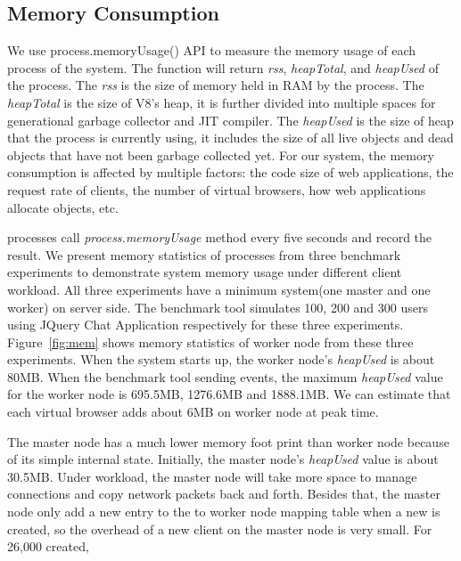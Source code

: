 \jquerychatlatency{}


\subsection{Memory Consumption}
We use \nodejs{} process.memoryUsage() API to measure the memory usage of each process
of the system.
The function will return \emph{rss}, \emph{heapTotal}, and \emph{heapUsed} of the process.
The \emph{rss} is the size of memory held in RAM by the process.
The \emph{heapTotal} is the size of V8's heap, it is further divided into
multiple spaces for generational garbage collector and JIT compiler.
The \emph{heapUsed} is the size of heap that the process is currently using,
it includes the size of all live objects and dead objects that have not been garbage collected yet.
For our system, the memory consumption is affected by multiple factors:
the code size of web applications, the request rate of clients,
the number of virtual browsers, how web applications allocate objects, etc.

\memfig{}

\cb{} processes call \emph{process.memoryUsage} method every five seconds and record
the result.
We present memory statistics of \cb{} processes from three benchmark experiments
 to demonstrate system memory usage under different client workload.
All three experiments have a minimum \cb{} system(one master and one worker) on server side.
The benchmark tool simulates 100, 200 and 300 users using JQuery Chat Application
respectively for these three experiments.
Figure~\ref{fig:mem} shows memory statistics of worker node from these three experiments.
When the system starts up, the worker node's \emph{heapUsed} is about 80MB.
When the benchmark tool sending events,
the maximum \emph{heapUsed} value for the worker node is
695.5MB, 1276.6MB and 1888.1MB.
We can estimate that each virtual browser adds about 6MB on worker node
at peak time.

The master node has a much lower memory foot print than worker node
because of its simple internal state.
Initially, the master node's \emph{heapUsed} value is about 30.5MB.
Under workload, the master node will take more space to manage connections and
copy network packets back and forth.
Besides that, 
the master node only add a new entry to the \appins{} to worker node mapping table
when a new \appins{} is created,
so the overhead of a new client on the master node is very small.
For 26,000 \appins{} created, %


